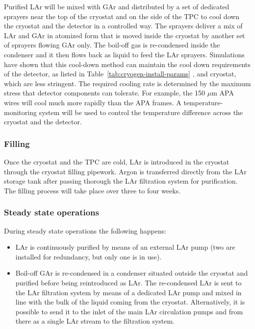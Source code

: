 Purified LAr will be mixed with GAr and distributed by a set of dedicated sprayers near the top of the cryostat and on the side of the TPC to cool down the cryostat and the detector in a controlled way. The sprayers deliver a mix of LAr and GAr in atomized form that is moved inside the cryostat by another set of sprayers flowing GAr only. The boil-off gas is re-condensed inside the condenser and it then flows back as liquid to feed the LAr sprayers. Simulations have shown that this cool-down method can maintain the cool down requirements of the detector, as listed in Table~\ref{tab:cryogen-install-params} , and cryostat, which are less stringent. The required cooling rate is determined by the maximum stress that detector components can tolerate. For example, the 150 $\mu$m APA wires will cool much more rapidly than the APA frames. A temperature-monitoring system will be used to control the temperature difference across the cryostat and the detector.

\subsubsection{Filling}

Once the cryostat and the TPC are cold, LAr is introduced in the cryostat through the cryostat filling pipework. Argon is transferred directly from the LAr storage tank after passing thorough the LAr filtration system for purification. The filling process will take place over three to four weeks.

\subsubsection{Steady state operations}

During steady state operations the following happens:
\begin{itemize}
\item LAr is continuously purified by means of an external LAr pump (two are installed for redundancy, but only one is in use).
\item Boil-off GAr is re-condensed in a condenser situated outside the cryostat and purified before being reintroduced as LAr. The re-condensed LAr is sent to the LAr filtration system by means of a dedicated LAr pump and mixed in line with the bulk of the liquid coming from the cryostat. Alternatively, it is possible to send it to the inlet of the main LAr circulation pumps and from there as a single LAr stream to the filtration system.
\end{itemize}


